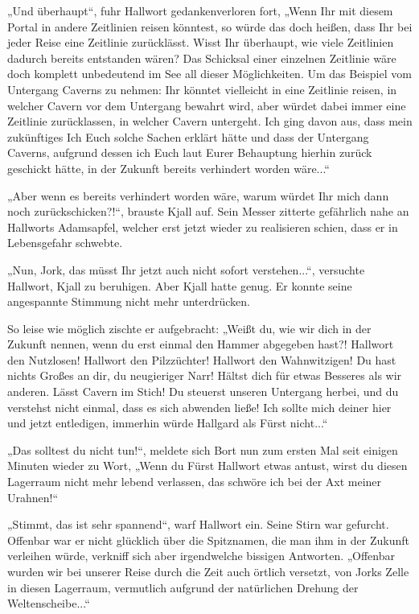 „Und überhaupt“, fuhr Hallwort gedankenverloren fort, „Wenn Ihr mit diesem Portal in andere Zeitlinien reisen könntest, so würde das doch heißen, dass Ihr bei jeder Reise eine Zeitlinie zurücklässt. Wisst Ihr überhaupt, wie viele Zeitlinien dadurch bereits entstanden wären? Das Schicksal einer einzelnen Zeitlinie wäre doch komplett unbedeutend im See all dieser Möglichkeiten. Um das Beispiel vom Untergang Caverns zu nehmen: Ihr könntet vielleicht in eine Zeitlinie reisen, in welcher Cavern vor dem Untergang bewahrt wird, aber würdet dabei immer eine Zeitlinie zurücklassen, in welcher Cavern untergeht. Ich ging davon aus, dass mein zukünftiges Ich Euch solche Sachen erklärt hätte und dass der Untergang Caverns, aufgrund dessen ich Euch laut Eurer Behauptung hierhin zurück geschickt hätte, in der Zukunft bereits verhindert worden wäre...“

„Aber wenn es bereits verhindert worden wäre, warum würdet Ihr mich dann noch zurückschicken?!“, brauste Kjall auf. Sein Messer zitterte gefährlich nahe an Hallworts Adamsapfel, welcher erst jetzt wieder zu realisieren schien, dass er in Lebensgefahr schwebte.

„Nun, Jork, das müsst Ihr jetzt auch nicht sofort verstehen...“, versuchte Hallwort, Kjall zu beruhigen. Aber Kjall hatte genug. Er konnte seine angespannte Stimmung nicht mehr unterdrücken.

So leise wie möglich zischte er aufgebracht: „Weißt du, wie wir dich in der Zukunft nennen, wenn du erst einmal den Hammer abgegeben hast?! Hallwort den Nutzlosen! Hallwort den Pilzzüchter! Hallwort den Wahnwitzigen! Du hast nichts Großes an dir, du neugieriger Narr! Hältst dich für etwas Besseres als wir anderen. Lässt Cavern im Stich! Du steuerst unseren Untergang herbei, und du verstehst nicht einmal, dass es sich abwenden ließe! Ich sollte mich deiner hier und jetzt entledigen, immerhin würde Hallgard als Fürst nicht...“

„Das solltest du nicht tun!“, meldete sich Bort nun zum ersten Mal seit einigen Minuten wieder zu Wort, „Wenn du Fürst Hallwort etwas antust, wirst du diesen Lagerraum nicht mehr lebend verlassen, das schwöre ich bei der Axt meiner Urahnen!“

„Stimmt, das ist sehr spannend“, warf Hallwort ein. Seine Stirn war gefurcht. Offenbar war er nicht glücklich über die Spitznamen, die man ihm in der Zukunft verleihen würde, verkniff sich aber irgendwelche bissigen Antworten. „Offenbar wurden wir bei unserer Reise durch die Zeit auch örtlich versetzt, von Jorks Zelle in diesen Lagerraum, vermutlich aufgrund der natürlichen Drehung der Weltenscheibe...“

